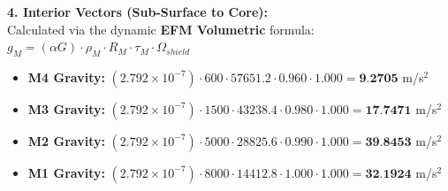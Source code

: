 \documentclass[11pt, a4paper]{article}
\begin{document}
  \vspace{0.5em}
  \noindent \textbf{4. Interior Vectors (Sub-Surface to Core):} \\[0.5em]
  \hspace*{1em} Calculated via the dynamic \textbf{EFM Volumetric} formula: $g_M = (\alpha G) \cdot \rho_{M} \cdot R_M \cdot \tau_M \cdot \Omega_{shield}$
  \begin{itemize}
    \item \textbf{M4 Gravity:} $(2.792 \times 10^{-7}) \cdot 600 \cdot 57651.2 \cdot 0.960 \cdot 1.000 = \textbf{9.2705}$ m/s$^2$
    \item \textbf{M3 Gravity:} $(2.792 \times 10^{-7}) \cdot 1500 \cdot 43238.4 \cdot 0.980 \cdot 1.000 = \textbf{17.7471}$ m/s$^2$
    \item \textbf{M2 Gravity:} $(2.792 \times 10^{-7}) \cdot 5000 \cdot 28825.6 \cdot 0.990 \cdot 1.000 = \textbf{39.8453}$ m/s$^2$
    \item \textbf{M1 Gravity:} $(2.792 \times 10^{-7}) \cdot 8000 \cdot 14412.8 \cdot 1.000 \cdot 1.000 = \textbf{32.1924}$ m/s$^2$
  \end{itemize}
\end{document}
